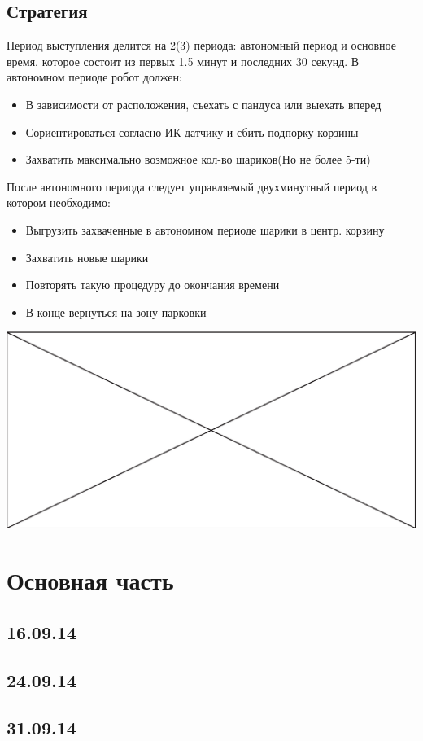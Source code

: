 \documentclass[11pt]{article}
\newcommand\measurepage{\dimexpr\pagegoal-\pagetotal-\baselineskip\relax}
\newcommand\fillpage{\includegraphics[width=\textwidth, height=\measurepage]{img/fill_page.eps}}
\begin{document}
		\subsection{Стратегия}
			Период выступления делится на 2(3) периода: автономный период и основное время, которое состоит из первых 1.5 минут и последних 30 секунд.
			В автономном периоде робот должен:
			\begin{itemize}
				\item В зависимости от расположения, съехать с пандуса или выехать вперед
				\item Сориентироваться согласно ИК-датчику и сбить подпорку корзины
				\item Захватить максимально возможное кол-во шариков(Но не более 5-ти)
			\end{itemize}
			После автономного периода следует управляемый двухминутный период в котором необходимо:
			\begin{itemize}
				\item Выгрузить захваченные в автономном периоде шарики в центр. корзину
				\item Захватить новые шарики 
				\item Повторять такую процедуру до окончания времени
				\item В конце вернуться на зону парковки
			\end{itemize}
			\fillpage
	
		

	
	
	\section{Основная часть}
	
	\subsection{16.09.14}
	
	
	\subsection{24.09.14}
	

	\subsection{31.09.14}
	
\end{document}
